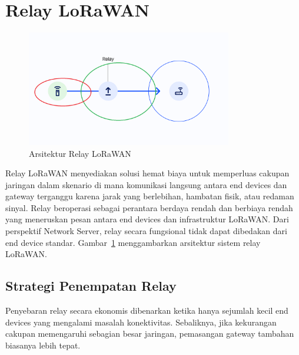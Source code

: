\section{Relay LoRaWAN}
\begin{figure}
    \centering
    \includegraphics[width=0.8\textwidth]{figures/relay-placement.png}
    \caption{Arsitektur Relay LoRaWAN}
    \label{fig:lora_relay}
\end{figure}
Relay LoRaWAN menyediakan solusi hemat biaya untuk memperluas cakupan jaringan dalam skenario di mana komunikasi langsung antara end devices dan gateway terganggu karena jarak yang berlebihan, hambatan fisik, atau redaman sinyal. Relay beroperasi sebagai perantara berdaya rendah dan berbiaya rendah yang meneruskan pesan antara end devices dan infrastruktur LoRaWAN. Dari perspektif Network Server, relay secara fungsional tidak dapat dibedakan dari end device standar.
Gambar~\ref{fig:lora_relay} menggambarkan arsitektur sistem relay LoRaWAN.
\subsection{Strategi Penempatan Relay}
Penyebaran relay secara ekonomis dibenarkan ketika hanya sejumlah kecil end devices yang mengalami masalah konektivitas. Sebaliknya, jika kekurangan cakupan memengaruhi sebagian besar jaringan, pemasangan gateway tambahan biasanya lebih tepat.
